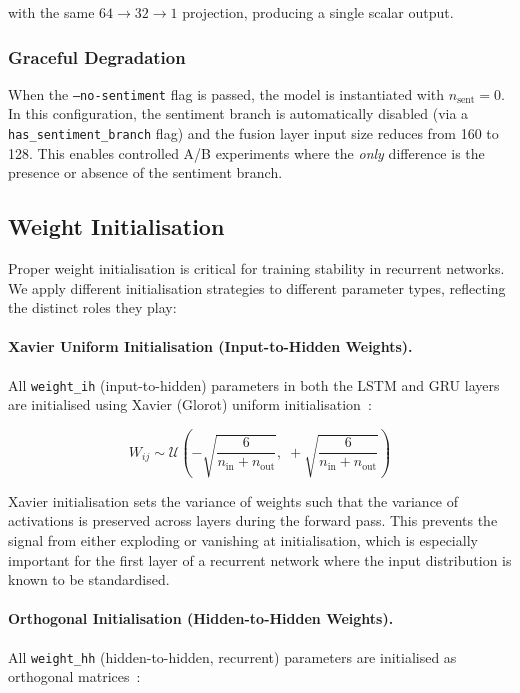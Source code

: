 with the same $64 \to 32 \to 1$ projection, producing a single scalar output.

\subsubsection{Graceful Degradation}

When the \texttt{--no-sentiment} flag is passed, the model is instantiated with
$n_{\text{sent}} = 0$.  In this configuration, the sentiment branch is
automatically disabled (via a \texttt{has\_sentiment\_branch} flag) and the
fusion layer input size reduces from 160 to 128.  This enables controlled A/B
experiments where the \emph{only} difference is the presence or absence of the
sentiment branch.

\subsection{Weight Initialisation}
\label{sec:weight-init}

Proper weight initialisation is critical for training stability in recurrent
networks.  We apply different initialisation strategies to different parameter
types, reflecting the distinct roles they play:

\paragraph{Xavier Uniform Initialisation (Input-to-Hidden Weights).}
All \texttt{weight\_ih} (input-to-hidden) parameters in both the LSTM and GRU
layers are initialised using Xavier (Glorot) uniform
initialisation~\cite{glorot2010understanding}:

\begin{equation}
  W_{ij} \sim \mathcal{U}\!\left(-\sqrt{\frac{6}{n_{\text{in}} + n_{\text{out}}}},\;
  +\sqrt{\frac{6}{n_{\text{in}} + n_{\text{out}}}}\right)
\end{equation}

Xavier initialisation sets the variance of weights such that the variance of
activations is preserved across layers during the forward pass.  This prevents
the signal from either exploding or vanishing at initialisation, which is
especially important for the first layer of a recurrent network where the input
distribution is known to be standardised.

\paragraph{Orthogonal Initialisation (Hidden-to-Hidden Weights).}
All \texttt{weight\_hh} (hidden-to-hidden, recurrent) parameters are initialised
as orthogonal matrices~\cite{saxe2014exact}:

